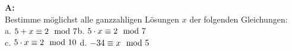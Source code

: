 \documentclass[landscape,twocolumn,a4paper]{article}
\begin{document}
\textbf{A:}   \\
Bestimme möglichst alle ganzzahligen Lösungen $x$ der folgenden
  Gleichungen: \\
a. $5+x\equiv2\mod7$\quad b.   $5\cdot x\equiv2\mod7$ \\ 
c. $5\cdot x\equiv2\mod10$  \quad d.  $-34\equiv x\mod5$
\bigskip {}
\end{document}
